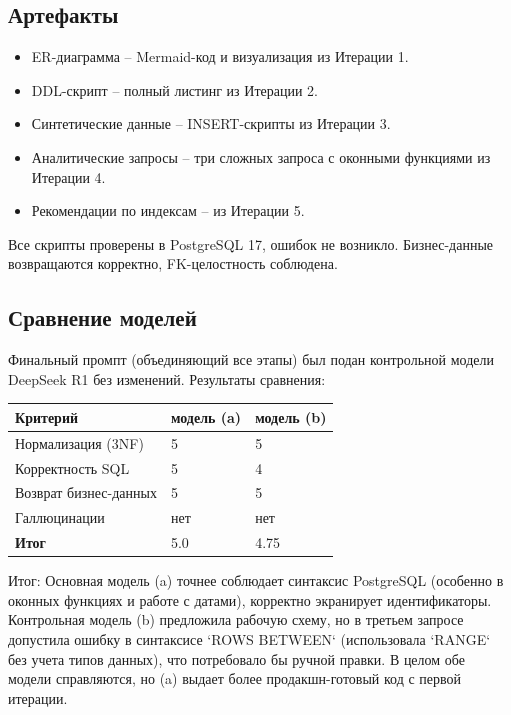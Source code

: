 \subsection{Артефакты}
\begin{itemize}
\item ER-диаграмма – Mermaid-код и визуализация из Итерации 1.
\item DDL-скрипт – полный листинг из Итерации 2.
\item Синтетические данные – INSERT-скрипты из Итерации 3.
\item Аналитические запросы – три сложных запроса с оконными функциями из Итерации 4.
\item Рекомендации по индексам – из Итерации 5.
\end{itemize}
Все скрипты проверены в PostgreSQL 17, ошибок не возникло. Бизнес-данные возвращаются корректно, FK-целостность соблюдена.

\subsection{Сравнение моделей}
Финальный промпт (объединяющий все этапы) был подан контрольной модели DeepSeek R1 без изменений.
Результаты сравнения:
\begin{table}[h!]
\centering
\begin{tabular}{|l|p{5cm}|p{5cm}|}
\hline
\textbf{Критерий} & \textbf{модель (a)} & \textbf{модель (b)} \\
\hline
Нормализация (3NF) & 5 & 5 \\
\hline
Корректность SQL & 5 & 4 \\
\hline
Возврат бизнес-данных & 5 & 5 \\
\hline
Галлюцинации & нет & нет \\
\hline
\textbf{Итог} & 5.0 & 4.75 \\
\hline
\end{tabular}
\end{table}
Итог: Основная модель (a) точнее соблюдает синтаксис PostgreSQL (особенно в оконных функциях и работе с датами), корректно экранирует идентификаторы. Контрольная модель (b) предложила рабочую схему, но в третьем запросе допустила ошибку в синтаксисе `ROWS BETWEEN` (использовала `RANGE` без учета типов данных), что потребовало бы ручной правки. В целом обе модели справляются, но (a) выдает более продакшн-готовый код с первой итерации.

